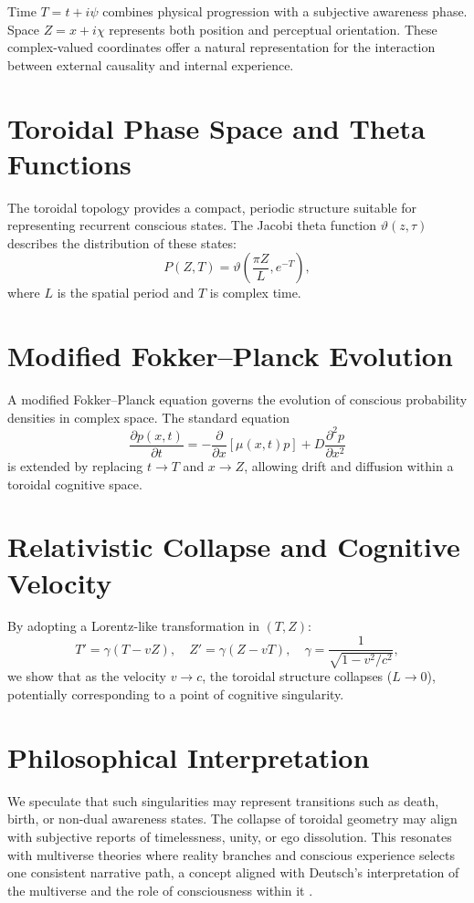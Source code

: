 \documentclass[12pt]{article}
\begin{document}
Time $T = t + i\psi$ combines physical progression with a subjective awareness phase. Space $Z = x + i\chi$ represents both position and perceptual orientation. These complex-valued coordinates offer a natural representation for the interaction between external causality and internal experience.

\section{Toroidal Phase Space and Theta Functions}

The toroidal topology provides a compact, periodic structure suitable for representing recurrent conscious states. The Jacobi theta function $\vartheta(z, \tau)$ \cite{mumford1983tata} describes the distribution of these states:
\[
P(Z, T) = \vartheta\left(\frac{\pi Z}{L}, e^{-T}\right),
\]
where $L$ is the spatial period and $T$ is complex time.

\section{Modified Fokker--Planck Evolution}

A modified Fokker--Planck equation governs the evolution of conscious probability densities in complex space. The standard equation
\[
\frac{\partial p(x,t)}{\partial t} = -\frac{\partial}{\partial x}[\mu(x,t)p] + D \frac{\partial^2 p}{\partial x^2}
\]
\cite{risken1996fokker}
is extended by replacing $t \rightarrow T$ and $x \rightarrow Z$, allowing drift and diffusion within a toroidal cognitive space.

\section{Relativistic Collapse and Cognitive Velocity}

By adopting a Lorentz-like transformation \cite{einstein1905elektrodynamik} in $(T, Z)$:
\[
T' = \gamma(T - vZ), \quad Z' = \gamma(Z - vT), \quad \gamma = \frac{1}{\sqrt{1 - v^2/c^2}},
\]
we show that as the velocity $v \rightarrow c$, the toroidal structure collapses ($L \rightarrow 0$), potentially corresponding to a point of cognitive singularity.

\section{Philosophical Interpretation}

We speculate that such singularities may represent transitions such as death, birth, or non-dual awareness states. The collapse of toroidal geometry may align with subjective reports of timelessness, unity, or ego dissolution. This resonates with multiverse theories where reality branches and conscious experience selects one consistent narrative path, a concept aligned with Deutsch's interpretation of the multiverse and the role of consciousness within it \cite{deutsch1997fabric}.
\end{document}

